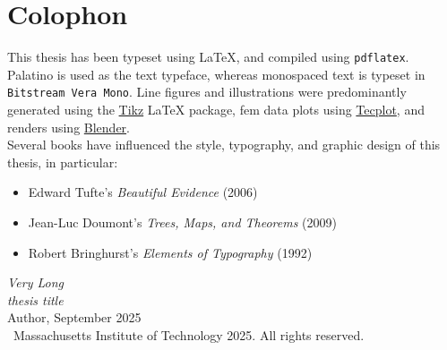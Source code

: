 {%
\thispagestyle{empty}%
\small%
\vfill%
%
\section*{Colophon}
\noindent This thesis has been typeset using \LaTeX{}, and compiled using \texttt{pdflatex}.
Palatino is used as the text typeface, %
whereas monospaced text is typeset in \texttt{Bitstream Vera Mono}.
Line figures and illustrations were predominantly generated  using the \href{https://ctan.org/pkg/pgf?lang=en}{Tikz} \LaTeX{} package, \acrshort{fem} data plots using \href{https://www.tecplot.com/}{Tecplot}, and renders using \href{https://www.blender.org/}{Blender}.
\mbox{}\vspace{0.5pc}\\
\noindent Several books have influenced the style, typography, and graphic design of this thesis, in particular:
\begin{itemize}
  \item[] Edward Tufte's \textit{Beautiful Evidence} (2006)
  \item[] Jean-Luc Doumont's \textit{Trees, Maps, and Theorems} (2009)
  \item[] Robert Bringhurst's \textit{Elements of Typography} (1992)
\end{itemize}
\vspace{0.75pc}%

\noindent\textit{Very Long }\\
\textit{thesis title}\vspace{0.25pc}\\
Author, September 2025 \vspace{1.25pc}\\
\noindent \textcopyright\ Massachusetts Institute of Technology 2025. All rights reserved.\vspace{1pc} \\
}
